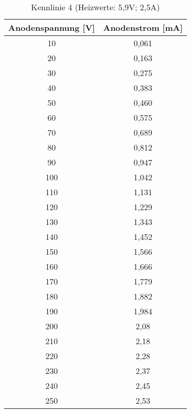 \begin{table}[h]
	\begin{center}
		\begin{tabular}{cc}
			Anodenspannung [V] & Anodenstrom [mA]\\ \hline
			10	&0,061\\
			20	&0,163\\
			30	&0,275\\
			40	&0,383\\
			50	&0,460\\
			60	&0,575\\
			70	&0,689\\
			80	&0,812\\
			90	&0,947\\
			100	&1,042\\
			110	&1,131\\
			120	&1,229\\
			130	&1,343\\
			140	&1,452\\
			150	&1,566\\
			160	&1,666\\
			170	&1,779\\
			180	&1,882\\
			190	&1,984\\
			200	&2,08\\
			210	&2,18\\
			220	&2,28\\
			230	&2,37\\
			240	&2,45\\
			250	&2,53
		\end{tabular}
		\caption{Kennlinie 4 (Heizwerte: 5,9V; 2,5A)}
		\label{taba4}
	\end{center}
\end{table}